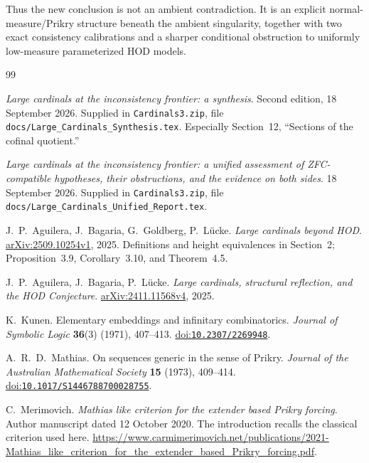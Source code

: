 \documentclass[11pt,letterpaper]{article}
\theoremstyle{definition}
\numberwithin{equation}{section}
\newcommand{\arxiv}[1]{\href{https://arxiv.org/abs/#1}{arXiv:#1}}
\newcommand{\doi}[1]{\href{https://doi.org/#1}{doi:\nolinkurl{#1}}}
\begin{document}
Thus the new conclusion is not an ambient contradiction. It is an
explicit normal-measure/Prikry structure beneath the ambient
singularity, together with two exact consistency calibrations and a
sharper conditional obstruction to uniformly low-measure
parameterized HOD models.

{}
\begin{thebibliography}{99}
\small
\setlength{\itemsep}{6pt}

\emph{Large cardinals at the inconsistency frontier: a synthesis}.
Second edition, 18 September 2026. Supplied in
\nolinkurl{Cardinals3.zip}, file
\nolinkurl{docs/Large_Cardinals_Synthesis.tex}.
Especially Section~12, ``Sections of the cofinal quotient.''

\emph{Large cardinals at the inconsistency frontier: a unified
assessment of ZFC-compatible hypotheses, their obstructions, and the
evidence on both sides}.
18 September 2026. Supplied in \nolinkurl{Cardinals3.zip}, file
\nolinkurl{docs/Large_Cardinals_Unified_Report.tex}.

J.~P.~Aguilera, J.~Bagaria, G.~Goldberg, P.~L\"ucke.
\emph{Large cardinals beyond HOD}.
\arxiv{2509.10254v1}, 2025.
Definitions and height equivalences in Section~2;
Proposition~3.9, Corollary~3.10, and Theorem~4.5.

J.~P.~Aguilera, J.~Bagaria, P.~L\"ucke.
\emph{Large cardinals, structural reflection, and the HOD Conjecture}.
\arxiv{2411.11568v4}, 2025.

K.~Kunen. Elementary embeddings and infinitary combinatorics.
\emph{Journal of Symbolic Logic} \textbf{36}(3) (1971), 407--413.
\doi{10.2307/2269948}.

A.~R.~D.~Mathias. On sequences generic in the sense of Prikry.
\emph{Journal of the Australian Mathematical Society}
\textbf{15} (1973), 409--414.
\doi{10.1017/S1446788700028755}.

C.~Merimovich. \emph{Mathias like criterion for the extender based
Prikry forcing}. Author manuscript dated 12 October 2020.
The introduction recalls the classical criterion used here.
\url{https://www.carmimerimovich.net/publications/2021-Mathias_like_criterion_for_the_extender_based_Prikry_forcing.pdf}.

\end{thebibliography}
\end{document}
